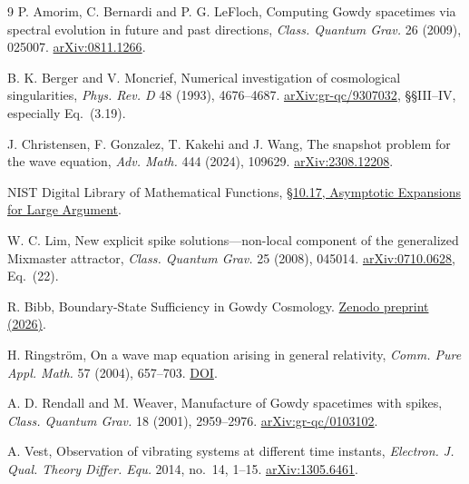 \documentclass[11pt]{article}
\begin{document}
\begin{thebibliography}{9}
 P. Amorim, C. Bernardi and P. G. LeFloch,
Computing Gowdy spacetimes via spectral evolution in future and past
directions, \emph{Class. Quantum Grav.} 26 (2009), 025007.
\href{https://arxiv.org/abs/0811.1266}{arXiv:0811.1266}.

 B. K. Berger and V. Moncrief,
Numerical investigation of cosmological singularities,
\emph{Phys. Rev. D} 48 (1993), 4676--4687.
\href{https://arxiv.org/abs/gr-qc/9307032}{arXiv:gr-qc/9307032},
\S\S III--IV, especially Eq.~(3.19).

 J. Christensen, F. Gonzalez, T. Kakehi and J. Wang,
The snapshot problem for the wave equation,
\emph{Adv. Math.} 444 (2024), 109629.
\href{https://arxiv.org/abs/2308.12208}{arXiv:2308.12208}.

 NIST Digital Library of Mathematical Functions,
\href{https://dlmf.nist.gov/10.17}{\S 10.17, Asymptotic Expansions for Large Argument}.

 W. C. Lim, New explicit spike solutions---non-local component
of the generalized Mixmaster attractor,
\emph{Class. Quantum Grav.} 25 (2008), 045014.
\href{https://arxiv.org/abs/0710.0628}{arXiv:0710.0628}, Eq.~(22).

 R. Bibb, Boundary-State Sufficiency in Gowdy Cosmology.
\href{https://doi.org/10.5281/zenodo.21959052}{Zenodo preprint (2026)}.

 H. Ringstr\"om, On a wave map equation arising in
general relativity, \emph{Comm. Pure Appl. Math.} 57 (2004), 657--703.
\href{https://doi.org/10.1002/cpa.20015}{DOI}.

 A. D. Rendall and M. Weaver,
Manufacture of Gowdy spacetimes with spikes,
\emph{Class. Quantum Grav.} 18 (2001), 2959--2976.
\href{https://arxiv.org/abs/gr-qc/0103102}{arXiv:gr-qc/0103102}.

 A. Vest, Observation of vibrating systems at different time
instants, \emph{Electron. J. Qual. Theory Differ. Equ.} 2014, no.~14, 1--15.
\href{https://arxiv.org/abs/1305.6461}{arXiv:1305.6461}.
\end{thebibliography}
\end{document}
